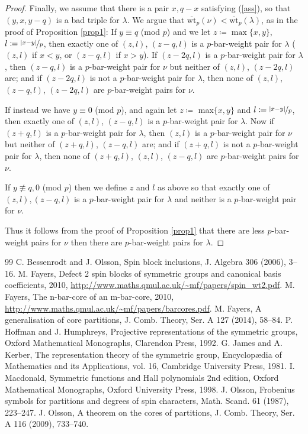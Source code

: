 \documentclass[10pt]{amsart}
\begin{document}
\begin{proof}
Finally, we assume that there is a pair $x,q-x$ satisfying (\ref{ass}), so that $(y,x,y-q)$ is a bad triple for $\lambda$. We argue that $\overline{\text{wt}}_p(\nu)<\overline{\text{wt}}_p(\lambda)$, as in the proof of Proposition \ref{prop1}: \newline
If $y\equiv q$ (mod $p$) and we let $z\coloneqq\max\{x,y\}$, $l\coloneqq\nicefrac{|x-y|}{p}$, then exactly one of $(z,l)$, $(z-q,l)$ is a $p$-bar-weight pair for $\lambda$ ($(z,l)$ if $x<y$, or $(z-q,l)$ if $x>y$). If $(z-2q,l)$ is a $p$-bar-weight pair for $\lambda$, then $(z-q,l)$ is a $p$-bar-weight pair for $\nu$ but neither of $(z,l)$, $(z-2q,l)$ are; and if $(z-2q,l)$ is not a $p$-bar-weight pair for $\lambda$, then none of $(z,l)$, $(z-q,l)$, $(z-2q,l)$ are $p$-bar-weight pairs for $\nu$. 

If instead we have $y\equiv 0$ (mod $p$), and again let $z\coloneqq$ max$\{x,y\}$ and $l\coloneqq\nicefrac{|x-y|}{p}$, then exactly one of $(z,l)$, $(z-q,l)$ is a $p$-bar-weight pair for $\lambda$. Now if $(z+q,l)$ is a $p$-bar-weight pair for $\lambda$, then $(z,l)$ is a $p$-bar-weight pair for $\nu$ but neither of $(z+q,l)$, $(z-q,l)$ are; and if $(z+q,l)$ is not a $p$-bar-weight pair for $\lambda$, then none of $(z+q,l)$, $(z,l)$, $(z-q,l)$ are $p$-bar-weight pairs for $\nu$. 

If $y\not\equiv q,0$ (mod $p$) then we define $z$ and $l$ as above so that exactly one of $(z,l),(z-q,l)$ is a $p$-bar-weight pair for $\lambda$ and neither is a $p$-bar-weight pair for $\nu$. 

Thus it follows from the proof of Proposition \ref{prop1} that there are less $p$-bar-weight pairs for $\nu$ then there are $p$-bar-weight pairs for $\lambda$. 
\end{proof}
\begin{thebibliography}{99}
 C. Bessenrodt and J. Olsson, Spin block inclusions, J. Algebra 306 (2006), 3--16.
 M. Fayers, Defect 2 spin blocks of symmetric groups and canonical basis coefficients, 2010, \url{http://www.maths.qmul.ac.uk/~mf/papers/spin_wt2.pdf}.
 M. Fayers, The n-bar-core of an m-bar-core, 2010, \url{http://www.maths.qmul.ac.uk/~mf/papers/barcores.pdf}.
 M. Fayers, A generalisation of core partitions, J. Comb. Theory, Ser. A 127 (2014), 58--84.
 P. Hoffman and J. Humphreys, Projective representations of the symmetric groups, Oxford Mathematical Monographs, Clarendon Press, 1992.
 G. James and A. Kerber, The representation theory of the symmetric group, Encyclop\ae dia of Mathematics and its Applications, vol. 16, Cambridge University Press, 1981.
 I. Macdonald, Symmetric functions and Hall polynomials 2nd edition, Oxford Mathematical Monographs, Oxford University Press, 1998.
 J. Olsson, Frobenius symbols for partitions and degrees of spin characters, Math. Scand. 61 (1987), 223--247.
 J. Olsson, A theorem on the cores of partitions, J. Comb. Theory, Ser. A 116 (2009), 733--740.
\end{thebibliography}
\end{document}
